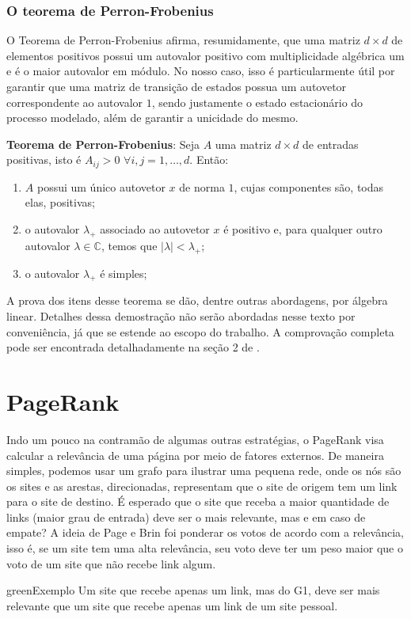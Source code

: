 \documentclass{article}
\begin{document}
\subsubsection*{O teorema de Perron-Frobenius}

O Teorema de Perron-Frobenius afirma, resumidamente, que uma matriz $d \times d$ de elementos positivos possui um autovalor positivo com multiplicidade algébrica um e é o maior autovalor em módulo. No nosso caso, isso é particularmente útil por garantir que uma matriz de transição de estados possua um autovetor correspondente ao autovalor $1$, sendo justamente o estado estacionário do processo modelado, além de garantir a unicidade do mesmo.

\noindent
\textbf{Teorema de Perron-Frobenius}: Seja $A$ uma matriz $d \times d$ de entradas positivas, isto é $A_{ij}>0$ $\forall i, j = 1, \dots, d$. Então:

\begin{enumerate}
    \item $A$ possui um único autovetor $x$ de norma $1$, cujas componentes são, todas elas, positivas;
    \item o autovalor $\lambda_+$ associado ao autovetor $x$ é positivo e, para qualquer outro autovalor $\lambda \in \mathbb{C}$, temos que $|\lambda| < \lambda_+$;
    \item o autovalor $\lambda_+$ é simples;
\end{enumerate}

A prova dos itens desse teorema se dão, dentre outras abordagens, por álgebra linear. Detalhes dessa demostração não serão abordadas nesse texto por conveniência, já que se estende ao escopo do trabalho. A comprovação completa pode ser encontrada detalhadamente na seção 2 de \cite{perron-frobenius}.


\section*{PageRank}

Indo um pouco na contramão de algumas outras estratégias, o PageRank visa calcular a relevância de uma página por meio de fatores externos. De maneira simples, podemos usar um grafo para ilustrar uma pequena rede, onde os nós são os sites e as arestas, direcionadas, representam que o site de origem tem um link para o site de destino. É esperado que o site que receba a maior quantidade de links (maior grau de entrada) deve ser o mais relevante, mas e em caso de empate? A ideia de Page e Brin foi ponderar os votos de acordo com a relevância, isso é, se um site tem uma alta relevância, seu voto deve ter um peso maior que o voto de um site que não recebe link algum.
\begin{mybox}{green}{Exemplo}
    Um site que recebe apenas um link, mas do G1, deve ser mais relevante que um site que recebe apenas um link de um site pessoal.
\end{mybox}
\end{document}
